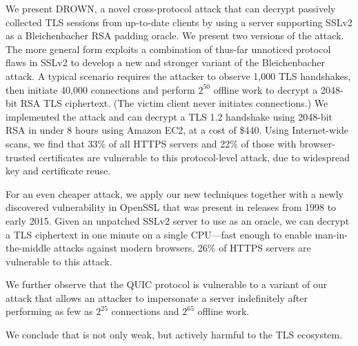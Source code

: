 We present DROWN, a novel cross-protocol attack that can decrypt
passively collected TLS sessions from up-to-date clients
by using a server supporting SSLv2 as a Bleichenbacher RSA
padding oracle.  We present two versions of the attack.  The more
general form exploits a combination of thus-far unnoticed protocol
flaws in SSLv2 to develop a new and stronger variant of the
Bleichenbacher attack.  A typical scenario requires the attacker to
observe 1,000 TLS handshakes, then initiate 40,000 \ssltwo connections
and perform $2^{50}$ offline work to decrypt a 2048-bit RSA TLS
ciphertext.  (The victim client never initiates \ssltwo connections.)
We implemented the attack and can decrypt a TLS 1.2
handshake using 2048-bit RSA in under 8 hours using Amazon EC2, at a
cost of \$440.  Using Internet-wide scans, we find that 33\% of all HTTPS servers and
22\% of those with browser-trusted certificates are vulnerable to this
protocol-level attack, due to widespread key and certificate reuse.

For an even cheaper attack, we apply our new
techniques together with a newly discovered vulnerability in OpenSSL that
was present in releases from 1998 to early 2015.  
Given an unpatched SSLv2 server to use as an oracle, we can
decrypt a TLS ciphertext in one minute on a single CPU---fast
enough to enable man-in-the-middle attacks against modern browsers.
26\% of HTTPS servers are vulnerable to this attack.

We further observe that the QUIC protocol is vulnerable to a variant
of our attack that allows an attacker to impersonate a server
indefinitely after performing as few as 
$2^{25}$ \ssltwo connections and $2^{65}$ offline work.

We conclude that \ssltwo is not only weak, but actively harmful to the TLS ecosystem.

